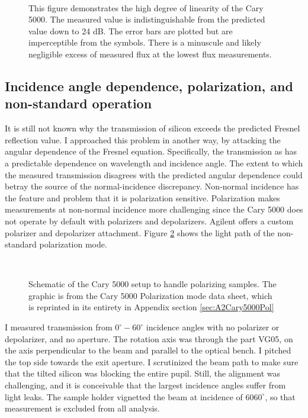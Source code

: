 \begin{figure}[h!] 
\begin{center}
\ 
\caption[Cary 5000 linearity plot]{This figure demonstrates the high degree of linearity of the Cary 5000.  The measured value is indistinguishable from the predicted value down to 24 dB.  The error bars are plotted but are imperceptible from the symbols.  There is a minuscule and likely negligible excess of measured flux at the lowest flux measurements.}
\label{fig:Cary5000linearity}
\end{center}
\end{figure}

\subsection{Incidence angle dependence, polarization, and non-standard operation}

It is still not known why the transmission of silicon exceeds the predicted Fresnel reflection value.  I approached this problem in another way, by attacking the angular dependence of the Fresnel equation.  Specifically, the transmission as has a predictable dependence on wavelength and incidence angle.  The extent to which the measured transmission disagrees with the predicted angular dependence could betray the source of the normal-incidence discrepancy.  Non-normal incidence has the feature and problem that it is polarization sensitive.  Polarization makes measurements at non-normal incidence more challenging since the Cary 5000 does not operate by default with polarizers and depolarizers.  Agilent offers a custom polarizer and depolarizer attachment.  Figure \ref{fig:Cary5000Polarizer} shows the light path of the non-standard polarization mode.

\begin{figure}[h!] 
\begin{center}
\ 
\caption[Cary 5000 Polarizer Setup]{Schematic of the Cary 5000 setup to handle polarizing samples.  The graphic is from the Cary 5000 Polarization mode data sheet, which is reprinted in its entirety in Appendix section \ref{sec:A2Cary5000Pol}}
\label{fig:Cary5000Polarizer}
\end{center}
\end{figure}

I measured transmission from $0^\circ - 60^\circ$ incidence angles with no polarizer or depolarizer, and no aperture.  The rotation axis was through the part VG05, on the axis perpendicular to the beam and parallel to the optical bench.  I pitched the top side towards the exit aperture.  I scrutinized the beam path to make sure that the tilted silicon was blocking the entire pupil.  Still, the alignment was challenging, and it is conceivable that the largest incidence angles suffer from light leaks.  The sample holder vignetted the beam at incidence of 60$60^\circ$, so that measurement is excluded from all analysis.


